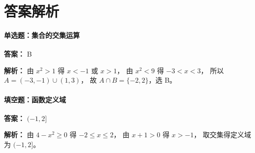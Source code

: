 \documentclass[11pt,a4paper]{article}
\begin{document}
\section*{答案解析}

\paragraph{单选题：集合的交集运算}
\textbf{答案：} B

\textbf{解析：} 由 \( x^2 > 1 \) 得 \( x < -1 \) 或 \( x > 1 \)，
由 \( x^2 < 9 \) 得 \( -3 < x < 3 \)，
所以 \( A = (-3, -1) \cup (1, 3) \)，
故 \( A \cap B = \{-2, 2\} \)，选 B。

\paragraph{填空题：函数定义域}
\textbf{答案：} \( (-1, 2] \)

\textbf{解析：} 由 \( 4 - x^2 \geq 0 \) 得 \( -2 \leq x \leq 2 \)，
由 \( x + 1 > 0 \) 得 \( x > -1 \)，
取交集得定义域为 \( (-1, 2] \)。
\end{document}
